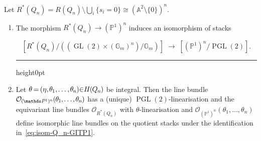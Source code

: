 \documentclass[ALCO,ThmDefs,Unicode,epreuves]{cedram}
\def\A{\mathds A}
\def\G{\mathds G}
\def\P{\mathds P}
\def\O{\mathcal O}
\newenvironment{equationi}{\par\noindent\vspace*{\abovedisplayskip}\begin{minipage}{\linewidth}
\begin{equation}}{\end{equation}\end{minipage}\hrule height0pt\leavevmode}
\DeclareMathOperator{\GL}{GL}
\DeclareMathOperator{\PGL}{PGL}
\newcommand*{\mk}{\mkern -1mu}
\newcommand*{\Mk}{\mkern -2mu}
\begin{document}
\begin{prop}\label{prop:Q_n-GITP1}
Let $R^*(Q_n)=R(Q_n)\setminus\bigcup_i\{s_i=0\}\cong(\A^2\setminus\{0\})^n$. %



\begin{enumerate}[label=(\alph*)]
\item\label{prop2.9_a}
The morphism $R^*(Q_n)\to(\P^1)^n$ induces an isomorphism of stacks
\begin{equationi}\label{eq:isom-Q_n-GITP1}
[R^*(Q_n)/((\GL(2)\times(\G_m)^n)/\G_m)]\;\to\;[(\P^1)^n/\PGL(2)].
\end{equationi}

\item\label{prop2.9_b}
Let $\theta \Mk = \Mk (\eta,\mk \theta_{\mk 1},\mk \ldots,\mk \theta_{\mk n}\mk )\Mk \! \in\Mk \!H\mk (\mk Q_{\mk n}\mk )\mk $ be integral. 
Then the line bundle %
$\mk \O_{\mk (\mk \P^{\mk 1}\mk )^{\mk n}}\mk (\mk \theta_{\mk 1}\mk ,\mk \ldots\mk ,\mk \theta_{\mk n}\mk )$ has a 
(unique) $\PGL(2)$-linearisation and the equivariant line bundles $\O_{R^*(Q_n)}$ with 
$\theta$-linearisation and $\O_{(\P^1)^n}(\theta_1,\ldots,\theta_n)$ define 
isomorphic line bundles on the quotient stacks under the identification 
in~\eqref{eq:isom-Q_n-GITP1}.
\end{enumerate}
\end{prop}
\end{document}
